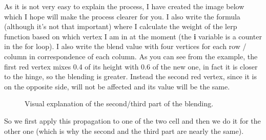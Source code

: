 \noindent
As it is not very easy to explain the process, I have created the image below which I hope will make the process clearer for you. I also write the formula (although it's not that important) where I calculate the weight of the lerp function based on which vertex I am in at the moment (the \textbf{i} variable is a counter in the for loop). I also write the blend value with four vertices for each row / column in correspondence of each column. As you can see from the example, the first red vertex mixes 0.4 of its height with 0.6 of the new one, in fact it is closer to the hinge, so the blending is greater. Instead the second red vertex, since it is on the opposite side, will not be affected and its value will be the same.

\begin{figure}[hbt!]
	\centering
	\vspace*{\fill}

	\noindent{}%

	\caption{Visual explanation of the second/third part of the blending.}
\end{figure} 

\newpage

\noindent
So we first apply this propagation to one of the two cell and then we do it for the other one (which is why the second and the third part are nearly the same).

